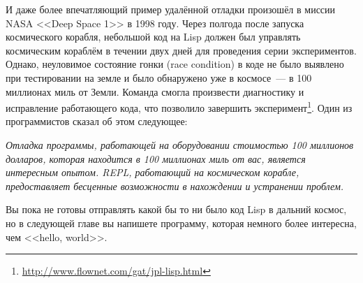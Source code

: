 И даже более впечатляющий пример удалённой отладки произошёл в миссии NASA <<Deep Space 1>>
в 1998 году. Через полгода после запуска космического корабля, небольшой код на Lisp
должен был управлять космическим кораблём в течении двух дней для проведения серии
экспериментов. Однако, неуловимое состояние гонки (race condition) в коде не было выявлено
при тестировании на земле и было обнаружено уже в космосе~--- в 100 миллионах миль от Земли.
Команда смогла произвести диагностику и исправление работающего кода, что позволило завершить
эксперимент\footnote{\url{http://www.flownet.com/gat/jpl-lisp.html}}. Один из
программистов сказал об этом следующее:

\emph{Отладка программы, работающей на оборудовании стоимостью 100 миллионов долларов, которая
находится в 100 миллионах миль от вас, является интересным опытом. REPL, работающий на
космическом корабле, предоставляет бесценные возможности в нахождении и устранении
проблем.}

Вы пока не готовы отправлять какой бы то ни было код Lisp в дальний космос, но в следующей
главе вы напишете программу, которая немного более интересна, чем <<hello, world>>.

